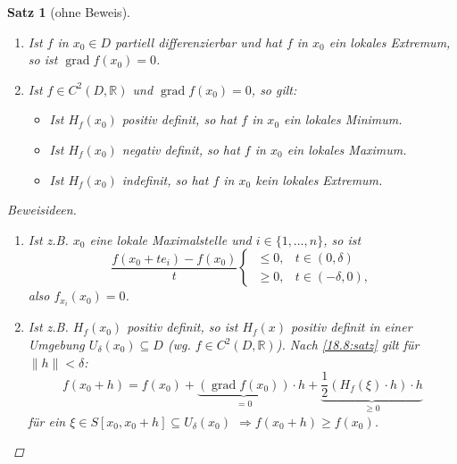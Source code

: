 \documentclass[12pt]{extreport} %
\newcommand{\R}{\mathbb{R}}
\theoremstyle{named}
\theoremstyle{nnamed}
\theoremstyle{itshape}
\newtheorem{satz}[unnamedtheorem]{Satz}
\theoremstyle{normal}
\begin{document}
\begin{satz}[ohne Beweis] ~\ \label{18.10:satz}
	\begin{enumerate}
		\item Ist $f$ in $x_{0} \in D$ partiell differenzierbar und hat $f$ in $x_{0}$ ein lokales Extremum, so ist $\operatorname{grad} f(x_{0}) = 0$.
		\item Ist $f \in C^{2}(D, \R)$ und $\operatorname{grad} f(x_{0}) =0$, so gilt: 
			\begin{itemize}
				\item Ist $H_{f}(x_{0})$ positiv definit, so hat $f$ in $x_{0}$ ein lokales Minimum.
				\item Ist $H_{f}(x_{0})$ negativ definit, so hat $f$ in $x_{0}$ ein lokales Maximum.
				\item Ist $H_{f}(x_{0})$ indefinit, so hat $f$ in $x_{0}$ kein lokales Extremum.
			\end{itemize}
	\end{enumerate}
	
	\begin{proof}[Beweisideen] ~\
		\begin{enumerate}
			\item Ist z.B. $x_{0}$ eine lokale Maximalstelle und $i \in \{1, \dotsc, n \}$, so ist
				$$ \frac{f(x_{0} + t e_{i}) - f(x_{0})}{t} \begin{cases} ~\leq 0, & t \in (0, \delta) \\ ~\geq 0, & t \in (-\delta, 0), \end{cases} $$
				also $f_{x_{i}}(x_{0}) = 0$.
			\item Ist z.B. $H_{f}(x_{0})$ positiv definit, so ist $H_{f}(x)$ positiv definit in einer Umgebung $U_{\delta}(x_{0}) \subseteq D$ (wg. $f \in C^{2}(D, \R)$). Nach \ref{18.8:satz} gilt für $\|h\| < \delta$:
				$$ f(x_{0} + h) = f(x_{0}) + \underbrace{\left( \operatorname{grad} f(x_{0}) \right)}_{= 0} \cdot h + \underbrace{\frac{1}{2} \left( H_{f}(\xi) \cdot h \right) \cdot h}_{\geq 0} $$
				für ein $\xi \in S\left[ x_{0}, x_{0} + h \right] \subseteq U_{\delta}(x_{0})$ $\Rightarrow f(x_{0} + h) \geq f(x_{0})$.
		\end{enumerate}
	\end{proof}
\end{satz}
\end{document}
